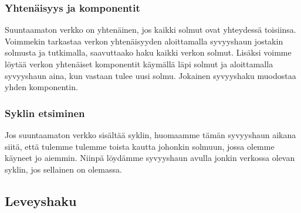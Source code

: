 \subsubsection{Yhtenäisyys ja komponentit}

Suuntaamaton verkko on yhtenäinen, 
jos kaikki solmut ovat yhteydessä toisiinsa.
Voimmekin tarkastaa verkon yhtenäisyyden aloittamalla
syvyyshaun jostakin solmusta ja tutkimalla,
saavuttaako haku kaikki verkon solmut.
Lisäksi voimme löytää verkon yhtenäiset komponentit
käymällä läpi solmut ja aloittamalla syvyyshaun aina,
kun vastaan tulee uusi solmu.
Jokainen syvyyshaku muodostaa yhden komponentin.

\subsubsection{Syklin etsiminen}

Jos suuntaamaton verkko sisältää syklin,
huomaamme tämän syvyyshaun aikana siitä,
että tulemme tulemme toista kautta johonkin solmuun,
jossa olemme käyneet jo aiemmin.
Niinpä löydämme syvyyshaun avulla jonkin verkossa olevan
syklin, jos sellainen on olemassa.

\subsection{Leveyshaku}

